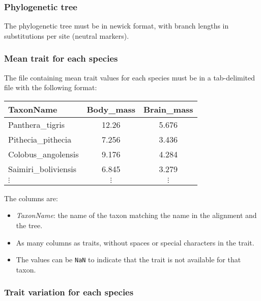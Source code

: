 \documentclass{article}
\begin{document}
\subsubsection{Phylogenetic tree}\label{subsubsec:phylogenetic-tree}

The phylogenetic tree must be in newick format, with branch lengths in substitutions per site (neutral markers).

\subsubsection{Mean trait for each species}\label{subsubsec:mean-trait-for-each-species}

The file containing mean trait values for each species must be in a tab-delimited file with the following format:
\begin{center}
    \begin{adjustbox}{width = 0.35\textwidth}
        \begin{tabular}{|l|c|c|}
            \hline
            TaxonName            & Body\_mass & Brain\_mass \\
            \hline
            Panthera\_tigris     & 12.26      & 5.676       \\
            Pithecia\_pithecia   & 7.256      & 3.436       \\
            Colobus\_angolensis  & 9.176      & 4.284       \\
            Saimiri\_boliviensis & 6.845      & 3.279       \\
            $\vdots$             & $\vdots$   & $\vdots$    \\
            \hline
        \end{tabular}\label{tab:trait-mean}
    \end{adjustbox}
\end{center}

The columns are:
\begin{itemize}
    \item \emph{TaxonName}: the name of the taxon matching the name in the alignment and the tree.
    \item As many columns as traits, without spaces or special characters in the trait.
    \item The values can be \texttt{NaN} to indicate that the trait is not available for that taxon.
\end{itemize}

\newpage
\subsubsection{Trait variation for each species}\label{subsubsec:trait-variation-for-each-species}
\end{document}
